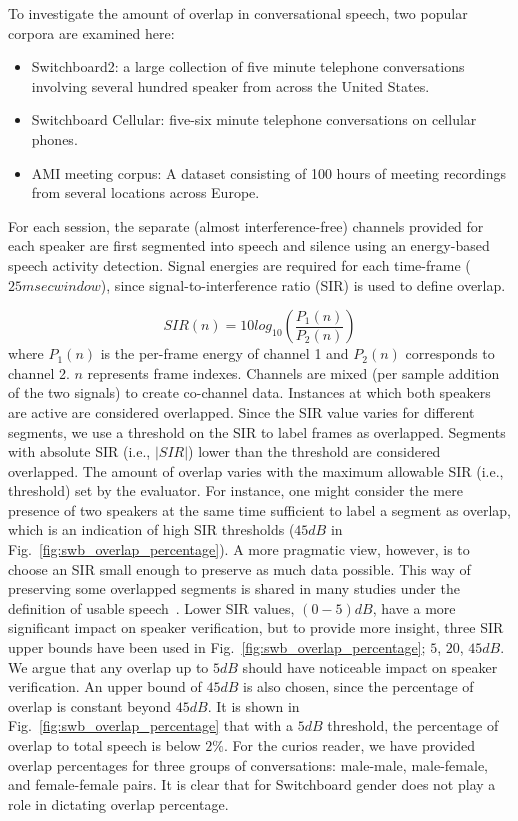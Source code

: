To investigate the amount of overlap in conversational speech, two popular corpora are examined here: 
\begin{itemize}
	\item Switchboard2: a large collection of five minute telephone conversations involving several hundred speaker from across the United States.
	\item Switchboard Cellular: five-six minute telephone conversations on cellular phones.
	\item AMI meeting corpus: A dataset consisting of 100 hours of meeting recordings from several locations across Europe. 
\end{itemize}
For each session, the separate (almost interference-free) channels provided for each speaker are first segmented into speech and silence using an energy-based speech activity detection. 
Signal energies are required for each time-frame ($25msec window$), since signal-to-interference ratio (SIR) is used to define overlap. 

\begin{equation}
\label{eq:abs_sir}
SIR(n) = 10log_{10}(\frac{P_1(n)}{P_2(n)})
\end{equation}
where $P_1(n)$ is the per-frame energy of channel 1 and $P_2(n)$ corresponds to channel 2. $n$ represents frame indexes. 
Channels are mixed (per sample addition of the two signals) to create co-channel data. 
Instances at which both speakers are active are considered overlapped. 
Since the SIR value varies for different segments, we use a threshold on the SIR to label frames as overlapped. 
Segments with absolute SIR (i.e., $|SIR|$) lower than the threshold are considered overlapped.
The amount of overlap varies with the maximum allowable SIR (i.e., threshold) set by the evaluator. 
For instance, one might consider the mere presence of two speakers at the same time sufficient to label a segment as overlap, which is an indication of high SIR thresholds ($45dB$ in Fig.~\ref{fig:swb_overlap_percentage}). 
A more pragmatic view, however, is to choose an SIR small enough to preserve as much data possible. 
This way of preserving some overlapped segments is shared in many studies under the definition of usable speech~\cite{yantorno_report,smolenski_tut}. 
Lower SIR values, $(0-5) dB$, have a more significant impact on speaker verification, but to provide more insight, three SIR upper bounds have been used in Fig.~\ref{fig:swb_overlap_percentage}; $5$, $20$, $45dB$. 
We argue that any overlap up to $5dB$ should have noticeable impact on speaker verification. 
An upper bound of $45dB$ is also chosen, since the percentage of overlap is constant beyond $45dB$. 
It is shown in Fig.~\ref{fig:swb_overlap_percentage} that with a $5dB$ threshold, the percentage of overlap to total speech is below $2\%$. 
For the curios reader, we have provided overlap percentages for three groups of conversations: male-male, male-female, and female-female pairs. 
It is clear that for Switchboard gender does not play a role in dictating overlap percentage. 

